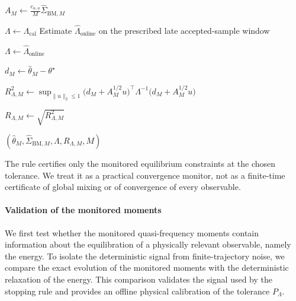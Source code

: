 \documentclass[showpacs,amsmath,amssymb,twocolumn,prx,superscriptaddress,10pt,aps,nofootinbib]{revtex4-2}
\begin{document}
\begin{algorithm}[H]
\begin{algorithmic}[1]
    \State
    $\displaystyle
    A_M
    \gets
    \frac{c_{\alpha,a}}{M}
    \widehat\Sigma_{\mathrm{BM},M}$

        \State
        $\Lambda\gets\Lambda_{\mathrm{cal}}$
    \Else
        \State Estimate
        $\widehat\Lambda_{\mathrm{online}}$
        on the prescribed late accepted-sample window

        \State
        $\Lambda\gets
        \widehat\Lambda_{\mathrm{online}}$
    \EndIf

    \State
    $d_M\gets
    \widehat\theta_M-\theta^\star$

    \State
    $\displaystyle
    R_{\Lambda,M}^2
    \gets
    \sup_{\lVert u\rVert_2\le 1}
    \bigl(d_M+A_M^{1/2}u\bigr)^\top
    \Lambda^{-1}
    \bigl(d_M+A_M^{1/2}u\bigr)$

    \State
    $R_{\Lambda,M}
    \gets
    \sqrt{R_{\Lambda,M}^2}$

        \State
        \Return
        $(\widehat\theta_M,
          \widehat\Sigma_{\mathrm{BM},M},
          \Lambda,
          R_{\Lambda,M},
          M)$
    \EndIf
\EndLoop

\end{algorithmic}
\end{algorithm}

The rule certifies only the monitored equilibrium constraints at the chosen
tolerance. We treat it as a practical convergence monitor, not as a finite-time certificate of global mixing or of convergence of every observable.


\paragraph{Validation of the monitored moments}
\label{sec:monitored_moment_validation}
We first test whether the monitored quasi-frequency moments contain information about the equilibration of a physically relevant observable, namely the energy. To isolate the deterministic signal from finite-trajectory noise, we compare the exact evolution of the monitored moments with the deterministic relaxation of the energy. This comparison validates the signal used by the stopping rule and provides an offline physical calibration of the tolerance $P_\Lambda$. 
\end{document}
